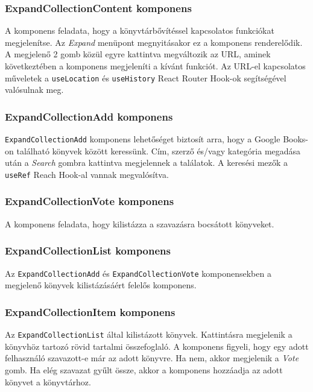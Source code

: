\subsubsection{ExpandCollectionContent komponens}

A komponens feladata, hogy a könyvtárbővítéssel kapcsolatos funkciókat megjelenítse. Az \textit{Expand} menüpont megnyitásakor ez a komponens renderelődik. A megjelenő 2 gomb közül egyre kattintva megváltozik az URL, aminek következtében a komponens megjeleníti a kívánt funkciót. Az URL-el kapcsolatos műveletek a \texttt{useLocation} és \texttt{useHistory} React Router Hook-ok segítségével valósulnak meg.

\subsubsection{ExpandCollectionAdd komponens}

\texttt{ExpandCollectionAdd} komponens lehetőséget biztosít arra, hogy a Google Books-on található könyvek között keressünk. Cím, szerző és/vagy kategória megadása után a \textit{Search} gombra kattintva megjelennek a találatok. A keresési mezők a \texttt{useRef} Reach Hook-al vannak megvalósítva.

\subsubsection{ExpandCollectionVote komponens}

A komponens feladata, hogy kilistázza a szavazásra bocsátott könyveket.

\subsubsection{ExpandCollectionList komponens}

Az \texttt{ExpandCollectionAdd} és \texttt{ExpandCollectionVote} komponensekben a megjelenő könyvek kilistázásáért felelős komponens.

\subsubsection{ExpandCollectionItem komponens}

Az \texttt{ExpandCollectionList} által kilistázott könyvek. Kattintásra megjelenik a könyvhöz tartozó rövid tartalmi összefoglaló. A komponens figyeli, hogy egy adott felhasználó szavazott-e már az adott könyvre. Ha nem, akkor megjelenik a \textit{Vote} gomb. Ha elég szavazat gyűlt össze, akkor a komponens hozzáadja az adott könyvet a könyvtárhoz. 


